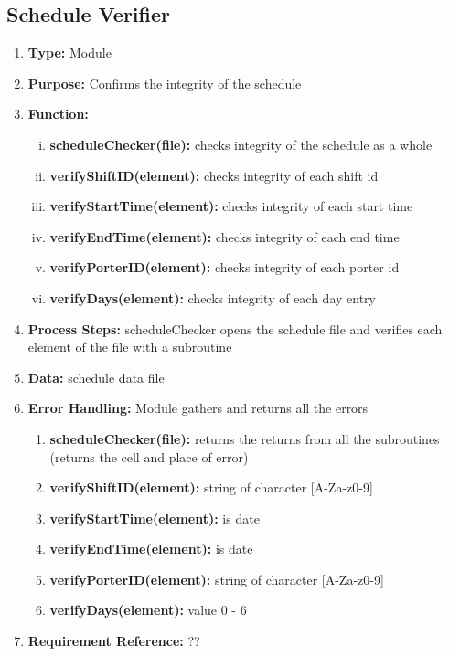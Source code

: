 \documentclass[paper=letter, fontsize=10pt]{scrartcl}
\numberwithin{equation}{section}		%
\numberwithin{figure}{section}			%
\numberwithin{table}{section}				%
\begin{document}
\subsection{Schedule Verifier}
\begin{enumerate}[]
	\item \textbf{Type:} Module
	\item \textbf{Purpose:} Confirms the integrity of the schedule
	\item \textbf{Function:} 
	\begin{enumerate}[(i)]
		\item \textbf{scheduleChecker(file):} checks integrity of the schedule as a whole
		\item \textbf{verifyShiftID(element):} checks integrity of each shift id  
		\item \textbf{verifyStartTime(element):} checks integrity of each start time 
		\item \textbf{verifyEndTime(element):} checks integrity of each end time 
		\item \textbf{verifyPorterID(element):} checks integrity of each porter id 
		\item \textbf{verifyDays(element):} checks integrity of each day entry
	\end{enumerate}
	\item \textbf{Process Steps:} scheduleChecker opens the schedule file and verifies each element of the file with a subroutine
	\item \textbf{Data:} schedule data file
	\item \textbf{Error Handling:} Module gathers and returns all the errors
	\begin{enumerate}[]
		\item \textbf{scheduleChecker(file):} returns the returns from all the subroutines (returns the cell and place of error)
		\item \textbf{verifyShiftID(element):} string of character [A-Za-z0-9] 
		\item \textbf{verifyStartTime(element):} is date
		\item \textbf{verifyEndTime(element):} is date
		\item \textbf{verifyPorterID(element):} string of character [A-Za-z0-9] 
		\item \textbf{verifyDays(element):} value 0 - 6
	\end{enumerate}
	\item \textbf{Requirement Reference:} ??
\end{enumerate}
\end{document}
